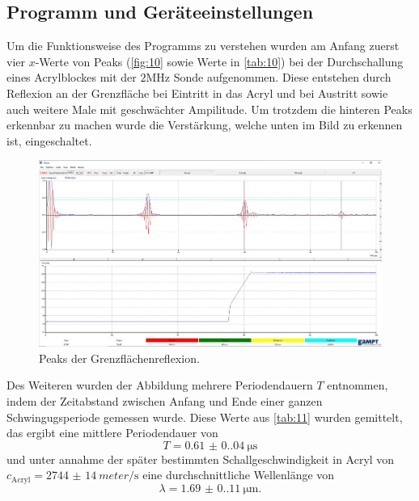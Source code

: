 \subsection{Programm und Geräteeinstellungen}
Um die Funktionsweise des Programms zu verstehen wurden am Anfang 
zuerst vier $x$-Werte von Peaks (\autoref{fig:10} sowie Werte in \autoref{tab:10})
bei der Durchschallung eines Acrylblockes mit der $2 \unit{\mega\hertz}$ Sonde
aufgenommen. Diese entstehen durch Reflexion an der Grenzfläche bei Eintritt in
das Acryl und bei Austritt sowie auch weitere Male mit geschwächter Ampilitude.
Um trotzdem die hinteren Peaks erkennbar zu machen wurde die Verstärkung,
welche unten im Bild zu erkennen ist, eingeschaltet.
\begin{figure}[H]
    \centering
    \caption{Peaks der Grenzflächenreflexion.}
    \label{fig:10}
    \includegraphics[width=\textwidth]{bilder/ssprogramm.jpg}
\end{figure}
\noindent Des Weiteren wurden der Abbildung mehrere Periodendauern $T$ entnommen, indem 
der Zeitabstand zwischen Anfang und Ende einer ganzen Schwingugsperiode 
gemessen wurde. Diese Werte aus \autoref{tab:11} wurden gemittelt, das
ergibt eine mittlere Periodendauer von 
\begin{equation}
   T = \qty{0.61(0.04)}{\micro\second}
\end{equation}
und unter annahme der später bestimmten Schallgeschwindigkeit in Acryl von $c_\text{Acryl} = \qty{2744(14)}{meter\per\second}$
eine durchschnittliche Wellenlänge von
\begin{equation}
   \lambda = \qty{1.69(0.11)}{\micro\meter}.
\end{equation}

